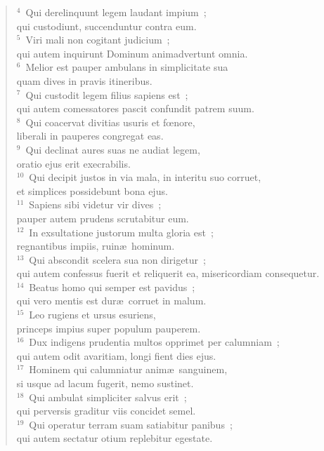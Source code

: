 \begin{flushleft}\begin{verse}${}^{4}$~Qui derelinquunt legem laudant impium~;\\ qui custodiunt, succenduntur contra eum.\\
${}^{5}$~Viri mali non cogitant judicium~;\\ qui autem inquirunt Dominum animadvertunt omnia.\\
${}^{6}$~Melior est pauper ambulans in simplicitate sua\\ quam dives in pravis itineribus.\\
${}^{7}$~Qui custodit legem filius sapiens est~;\\ qui autem comessatores pascit confundit patrem suum.\\
${}^{8}$~Qui coacervat divitias usuris et fœnore,\\ liberali in pauperes congregat eas.\\
${}^{9}$~Qui declinat aures suas ne audiat legem,\\ oratio ejus erit execrabilis.\\
${}^{10}$~Qui decipit justos in via mala, in interitu suo corruet,\\ et simplices possidebunt bona ejus.\\
${}^{11}$~Sapiens sibi videtur vir dives~;\\ pauper autem prudens scrutabitur eum.\\
${}^{12}$~In exsultatione justorum multa gloria est~;\\ regnantibus impiis, ruin\ae\ hominum.\\
${}^{13}$~Qui abscondit scelera sua non dirigetur~;\\ qui autem confessus fuerit et reliquerit ea, misericordiam consequetur.\\
${}^{14}$~Beatus homo qui semper est pavidus~;\\ qui vero mentis est dur\ae\ corruet in malum.\\
${}^{15}$~Leo rugiens et ursus esuriens,\\ princeps impius super populum pauperem.\\
${}^{16}$~Dux indigens prudentia multos opprimet per calumniam~;\\ qui autem odit avaritiam, longi fient dies ejus.\\
${}^{17}$~Hominem qui calumniatur anim\ae\ sanguinem,\\ si usque ad lacum fugerit, nemo sustinet.\\
${}^{18}$~Qui ambulat simpliciter salvus erit~;\\ qui perversis graditur viis concidet semel.\\
${}^{19}$~Qui operatur terram suam satiabitur panibus~;\\ qui autem sectatur otium replebitur egestate.\end{verse}\end{flushleft}


